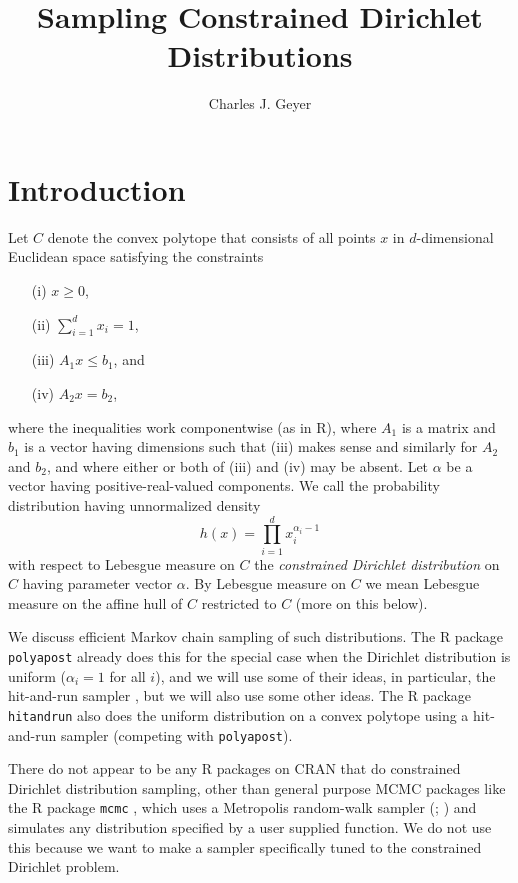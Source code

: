 \documentclass[11pt]{article}
\begin{document}
\title{Sampling Constrained Dirichlet Distributions}

\author{Charles J. Geyer}

\maketitle

\section{Introduction}

Let $C$ denote the convex polytope that consists of all points $x$ in
$d$-dimensional Euclidean space satisfying the constraints
\begin{enumerate}
\item[(i)] $x \ge 0$,
\item[(ii)] $\sum_{i = 1}^d x_i = 1$,
\item[(iii)] $A_1 x \le b_1$, and
\item[(iv)] $A_2 x = b_2$,
\end{enumerate}
where the inequalities work componentwise (as in R), where $A_1$ is a matrix
and $b_1$ is a vector having dimensions such that (iii) makes sense and
similarly for $A_2$ and $b_2$, and where either or both of (iii) and (iv)
may be absent.  Let $\alpha$ be a vector having positive-real-valued
components.  We call the probability distribution having unnormalized density
\begin{equation} \label{eq:unnormalized-density}
   h(x) = \prod_{i = 1}^d x_i^{\alpha_i - 1}
\end{equation}
with respect to Lebesgue measure on $C$ the \emph{constrained Dirichlet
distribution} on $C$ having parameter vector $\alpha$.
By Lebesgue measure on $C$ we mean Lebesgue measure on the affine hull
of $C$ restricted to $C$ (more on this below).

We discuss efficient Markov chain sampling of such distributions.
The R package \texttt{polyapost} \citep{polyapost} already does this
for the special case when the Dirichlet distribution is uniform
($\alpha_i = 1$ for all $i$), and we will use some
of their ideas, in particular, the hit-and-run sampler
\citep*{smith,hit-run-one,hit-run-two}, but we will also use some other ideas.
The R package \texttt{hitandrun} \citep{hitandrun}
also does the uniform distribution on a
convex polytope using a hit-and-run sampler (competing with \texttt{polyapost}).

There do not appear to be any R packages on CRAN that do constrained Dirichlet
distribution sampling, other than general purpose MCMC packages like
the R package \texttt{mcmc} \citep{mcmc}, which uses a Metropolis
random-walk sampler (\citealp{metropolis-et-al};
\citealp[Section~2.3.2]{tierney})
and simulates any distribution specified by a user
supplied function.  We do not use this because we want to make a sampler
specifically tuned to the constrained Dirichlet problem.
\end{document}
